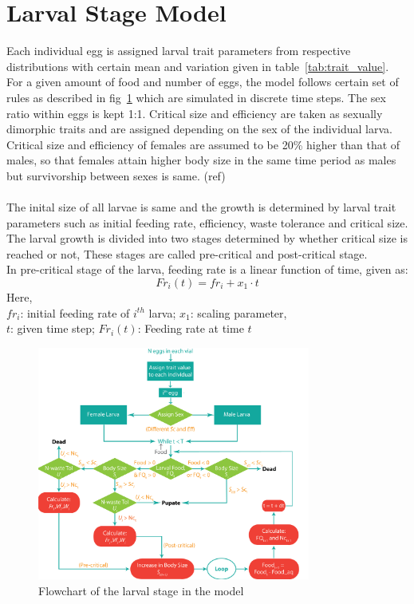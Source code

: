 \section{Larval Stage Model}
Each individual egg is assigned larval trait parameters from respective distributions with certain mean and variation given in table~\ref{tab:trait_value}. For a given amount of food and number of eggs, the model follows certain set of rules as described in fig~\ref{fig:larval_model} which are simulated in discrete time steps. The sex ratio within eggs is kept 1:1. Critical size and efficiency are taken as sexually dimorphic traits and are assigned depending on the sex of the individual larva. Critical size and efficiency of females are assumed to be 20\% higher than that of males, so that females attain higher body size in the same time period as males but survivorship between sexes is same. (ref)\\ \\
The inital size of all larvae is same and the growth is determined by larval trait parameters such as initial feeding rate, efficiency, waste tolerance and critical size. The larval growth is divided into two stages determined by whether critical size is reached or not, These stages are called pre-critical and post-critical stage. \\
In pre-critical stage of the larva, feeding rate is a linear function of time, given as:
\[Fr_{i}(t) = fr_{i} + x_{1}\cdot t\]
Here, \\
$fr_{i}$: initial feeding rate of $i^{th}$ larva; $x_{1}$: scaling parameter, \\
$t$: given time step; $Fr_{i}(t)$: Feeding rate at time $t$
\begin{figure}[h]
  \centering
  \includegraphics[width=0.8\textwidth]{C2/Figs/larval_model}
  \caption{Flowchart of the larval stage in the model}
  \label{fig:larval_model}
\end{figure}\\

